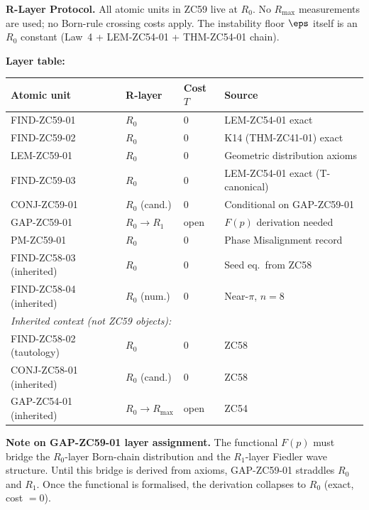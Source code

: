 \documentclass[12pt, a4paper]{article}
\begin{document}
\begin{layerbox}[title={R-Layer Assignments for ZC59}]
\textbf{R-Layer Protocol.}
All atomic units in ZC59 live at $R_0$.  No $R_{\max}$
measurements are used; no Born-rule crossing costs apply.
The instability floor $\eps$ itself is an $R_0$ constant
(Law~4 + LEM-ZC54-01 + THM-ZC54-01 chain).

\medskip
\textbf{Layer table:}
\begin{center}
{\small
\renewcommand{\arraystretch}{1.25}
\begin{tabular}{@{}lllp{5.2cm}@{}}
\toprule
Atomic unit & R-layer & Cost $T$ & Source \\
\midrule
FIND-ZC59-01 & $R_0$ & $0$ & LEM-ZC54-01 exact \\
FIND-ZC59-02 & $R_0$ & $0$ & K14 (THM-ZC41-01) exact \\
LEM-ZC59-01  & $R_0$ & $0$ & Geometric distribution axioms \\
FIND-ZC59-03 & $R_0$ & $0$ & LEM-ZC54-01 exact (T-canonical) \\
CONJ-ZC59-01 & $R_0$ (cand.) & $0$ & Conditional on GAP-ZC59-01 \\
GAP-ZC59-01  & $R_0\!\to\!R_1$ & open & $F(p)$ derivation needed \\
PM-ZC59-01   & $R_0$ & $0$ & Phase Misalignment record \\
FIND-ZC58-03 (inherited) & $R_0$ & $0$ & Seed eq.\ from ZC58 \\
FIND-ZC58-04 (inherited) & $R_0$ (num.) & $0$ & Near-$\pi$, $n=8$ \\
\midrule
\multicolumn{4}{l}{\textit{Inherited context (not ZC59 objects):}} \\
FIND-ZC58-02 (tautology)  & $R_0$ & $0$ & ZC58 \\
CONJ-ZC58-01 (inherited)  & $R_0$ (cand.) & $0$ & ZC58 \\
GAP-ZC54-01 (inherited)   & $R_0\!\to\!R_{\max}$ & open & ZC54 \\
\bottomrule
\end{tabular}
}
\end{center}

\medskip
\textbf{Note on GAP-ZC59-01 layer assignment.}
The functional $F(p)$ must bridge the $R_0$-layer Born-chain
distribution and the $R_1$-layer Fiedler wave structure.
Until this bridge is derived from axioms, GAP-ZC59-01 straddles
$R_0$ and $R_1$.  Once the functional is formalised, the
derivation collapses to $R_0$ (exact, cost $= 0$).
\end{layerbox}
\end{document}
